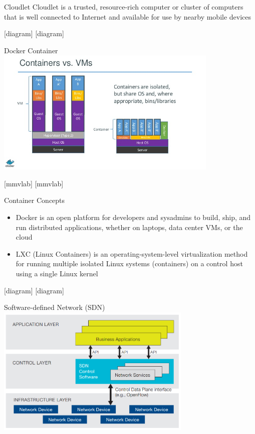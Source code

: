 \documentclass{beamer}
\begin{document}
\begin{frame}{Cloudlet}
Cloudlet is a trusted, resource-rich computer or cluster of computers that is well connected to Internet and available for use by nearby mobile devices
\end{frame}

[diagram]
[diagram]

\begin{frame}{Docker Container}
\centering
\includegraphics[width=0.8\textwidth]{images/docker}
\end{frame}

[mmvlab]
[mmvlab]

\begin{frame}{Container Concepts}
\begin{itemize}
\item Docker is an open platform for developers and sysadmins to build, ship, and run distributed applications, whether on laptops, data center VMs, or the cloud
\item LXC (Linux Containers) is an operating-system-level virtualization method for running multiple isolated Linux systems (containers) on a control host using a single Linux kernel
\end{itemize}
\end{frame}

[diagram]
[diagram]

\begin{frame}{Software-defined Network (SDN)}
\centering
\includegraphics[width=0.7\textwidth]{images/sdn}
\end{frame}
\end{document}
